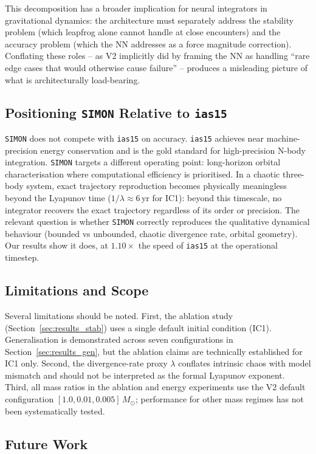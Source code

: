 \documentclass[12pt,a4paper]{article}
\newcommand{\simon}{\texttt{SIMON}}
\newcommand{\ias}{\texttt{ias15}}
\begin{document}
This decomposition has a broader implication for neural integrators in gravitational dynamics: the architecture must separately address the stability problem (which leapfrog alone cannot handle at close encounters) and the accuracy problem (which the NN addresses as a force magnitude correction). Conflating these roles -- as V2 implicitly did by framing the NN as handling ``rare edge cases that would otherwise cause failure'' -- produces a misleading picture of what is architecturally load-bearing.

\subsection{Positioning \simon{} Relative to \ias{}}

\simon{} does not compete with \ias{} on accuracy. \ias{} achieves near machine-precision energy conservation and is the gold standard for high-precision N-body integration. \simon{} targets a different operating point: long-horizon orbital characterisation where computational efficiency is prioritised. In a chaotic three-body system, exact trajectory reproduction becomes physically meaningless beyond the Lyapunov time ($1/\lambda \approx 6$\,yr for IC1): beyond this timescale, no integrator recovers the exact trajectory regardless of its order or precision. The relevant question is whether \simon{} correctly reproduces the qualitative dynamical behaviour (bounded vs unbounded, chaotic divergence rate, orbital geometry). Our results show it does, at $1.10\times$ the speed of \ias{} at the operational timestep.

\subsection{Limitations and Scope}

Several limitations should be noted. First, the ablation study (Section~\ref{sec:results_stab}) uses a single default initial condition (IC1). Generalisation is demonstrated across seven configurations in Section~\ref{sec:results_gen}, but the ablation claims are technically established for IC1 only. Second, the divergence-rate proxy $\lambda$ conflates intrinsic chaos with model mismatch and should not be interpreted as the formal Lyapunov exponent. Third, all mass ratios in the ablation and energy experiments use the V2 default configuration $[1.0, 0.01, 0.005]\,M_\odot$; performance for other mass regimes has not been systematically tested.

\subsection{Future Work}
\end{document}
